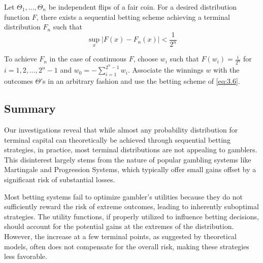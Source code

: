 \documentclass[11pt]{article}
\numberwithin{equation}{section}
\theoremstyle{boldStyle}
\begin{document}
Let \(\Theta_1, \ldots, \Theta_n\) be independent flips of a fair coin. 
For a desired distribution function \( F \), there exists a sequential betting scheme achieving a terminal distribution \( F_n \) such that 
\[
\sup_x |F(x) - F_n(x)| < \frac{1}{2^n}
\]

To achieve $F_n$ in the case of continuous $F$, choose $w_i$ such that $F(w_i) = \frac{i}{2^n}$ for $i = 1, 2, \ldots, 2^n - 1$ and $w_0 = -\sum_{i=1}^{2^n - 1} w_i$.
Associate the winnings $w$ with the outcomes $\Theta$'s in an arbitrary fashion and use the betting scheme of \ref{eq:3.6}.


\subsection{Summary}

Our investigations reveal that while almost any probability distribution for terminal capital can theoretically be achieved through sequential 
betting strategies, in practice, most terminal distributions are not appealing to gamblers. 
This disinterest largely stems from the nature of popular gambling systems like Martingale and Progression Systems, 
which typically offer small gains offset by a significant risk of substantial losses.

Most betting systems fail to optimize gambler's utilities because they do not sufficiently reward the risk of extreme outcomes, 
leading to inherently suboptimal strategies. The utility functions, if properly utilized to influence betting decisions, 
should account for the potential gains at the extremes of the distribution. However, the increase at a few terminal points, 
as suggested by theoretical models, often does not compensate for the overall risk, making these strategies less favorable.




\end{document}
